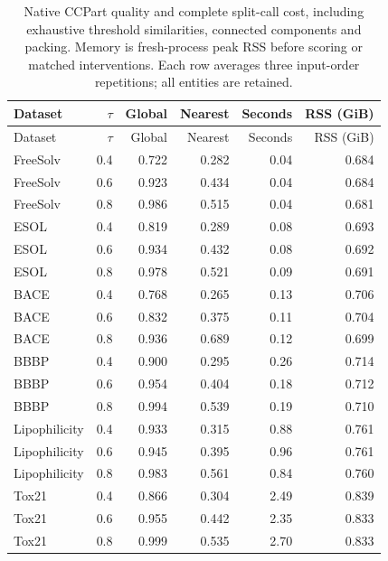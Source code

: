\begin{longtable}{lrrrrr}
\caption{Native CCPart quality and complete split-call cost, including exhaustive threshold similarities, connected components and packing. Memory is fresh-process peak RSS before scoring or matched interventions. Each row averages three input-order repetitions; all entities are retained.}\\
\toprule
Dataset & $\tau$ & Global & Nearest & Seconds & RSS (GiB)\\\midrule
\endfirsthead
\toprule
Dataset & $\tau$ & Global & Nearest & Seconds & RSS (GiB)\\\midrule
\endhead
\midrule\endfoot
\bottomrule\endlastfoot
FreeSolv & 0.4 & 0.722 & 0.282 & 0.04 & 0.684\\
FreeSolv & 0.6 & 0.923 & 0.434 & 0.04 & 0.684\\
FreeSolv & 0.8 & 0.986 & 0.515 & 0.04 & 0.681\\
ESOL & 0.4 & 0.819 & 0.289 & 0.08 & 0.693\\
ESOL & 0.6 & 0.934 & 0.432 & 0.08 & 0.692\\
ESOL & 0.8 & 0.978 & 0.521 & 0.09 & 0.691\\
BACE & 0.4 & 0.768 & 0.265 & 0.13 & 0.706\\
BACE & 0.6 & 0.832 & 0.375 & 0.11 & 0.704\\
BACE & 0.8 & 0.936 & 0.689 & 0.12 & 0.699\\
BBBP & 0.4 & 0.900 & 0.295 & 0.26 & 0.714\\
BBBP & 0.6 & 0.954 & 0.404 & 0.18 & 0.712\\
BBBP & 0.8 & 0.994 & 0.539 & 0.19 & 0.710\\
Lipophilicity & 0.4 & 0.933 & 0.315 & 0.88 & 0.761\\
Lipophilicity & 0.6 & 0.945 & 0.395 & 0.96 & 0.761\\
Lipophilicity & 0.8 & 0.983 & 0.561 & 0.84 & 0.760\\
Tox21 & 0.4 & 0.866 & 0.304 & 2.49 & 0.839\\
Tox21 & 0.6 & 0.955 & 0.442 & 2.35 & 0.833\\
Tox21 & 0.8 & 0.999 & 0.535 & 2.70 & 0.833\\
\end{longtable}
